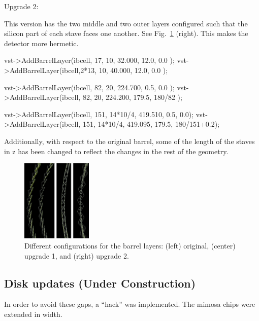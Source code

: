 \documentclass[12pt]{article}
\begin{document}
Upgrade 2:

This version has the two middle and two outer layers configured such that the silicon part of each stave
faces one another. See Fig.~\ref{fig:barrel_upgrades} (right). This makes the detector more hermetic.
\begin{tcolorbox}
\begin{verbnobox}[\scriptsize]
vst->AddBarrelLayer(ibcell,  17,      10,  32.000,  12.0, 0.0        );
vst->AddBarrelLayer(ibcell,2*13,      10,  40.000,  12.0, 0.0        );

vst->AddBarrelLayer(ibcell,  82,      20, 224.700,   0.5, 0.0        );
vst->AddBarrelLayer(ibcell,  82,      20, 224.200, 179.5, 180/82     );

vst->AddBarrelLayer(ibcell, 151, 14*10/4, 419.510,   0.5,         0.0);
vst->AddBarrelLayer(ibcell, 151, 14*10/4, 419.095, 179.5, 180/151+0.2);
\end{verbnobox}  
\end{tcolorbox}

Additionally, with respect to the original barrel, some of the length of the staves in z has been changed
to reflect the changes in the rest of the geometry.

\begin{figure}[H]
\centering
\includegraphics[width=0.3\textwidth]{figures/barrel_upgrades.jpg}
\caption{Different configurations for the barrel layers: (left) original, (center) upgrade 1, and (right) upgrade 2.}
\label{fig:barrel_upgrades}
\end{figure}

\subsection{Disk updates (Under Construction)}

In order to avoid these gaps, a ``hack'' was implemented. The mimosa chips were extended in width.
\end{document}
